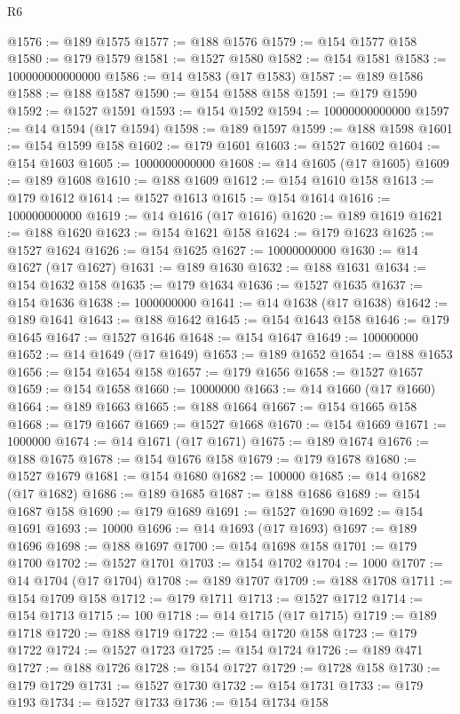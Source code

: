 \begin{lexlean}{R6}
\begin{coremodule}
{{{{{{{{{{{{{{{{{{{{{{{{{{{{{{{{{{{{{{{{{{{{{{{{{{{{{{{{{{{{{{{{{{{{{{{{@1576 := @189 @1575
@1577 := @188 @1576
@1579 := @154 @1577 @158
@1580 := @179 @1579
@1581 := @1527 @1580
@1582 := @154 @1581
@1583 := 100000000000000
@1586 := @14 @1583 (@17 @1583)
@1587 := @189 @1586
@1588 := @188 @1587
@1590 := @154 @1588 @158
@1591 := @179 @1590
@1592 := @1527 @1591
@1593 := @154 @1592
@1594 := 10000000000000
@1597 := @14 @1594 (@17 @1594)
@1598 := @189 @1597
@1599 := @188 @1598
@1601 := @154 @1599 @158
@1602 := @179 @1601
@1603 := @1527 @1602
@1604 := @154 @1603
@1605 := 1000000000000
@1608 := @14 @1605 (@17 @1605)
@1609 := @189 @1608
@1610 := @188 @1609
@1612 := @154 @1610 @158
@1613 := @179 @1612
@1614 := @1527 @1613
@1615 := @154 @1614
@1616 := 100000000000
@1619 := @14 @1616 (@17 @1616)
@1620 := @189 @1619
@1621 := @188 @1620
@1623 := @154 @1621 @158
@1624 := @179 @1623
@1625 := @1527 @1624
@1626 := @154 @1625
@1627 := 10000000000
@1630 := @14 @1627 (@17 @1627)
@1631 := @189 @1630
@1632 := @188 @1631
@1634 := @154 @1632 @158
@1635 := @179 @1634
@1636 := @1527 @1635
@1637 := @154 @1636
@1638 := 1000000000
@1641 := @14 @1638 (@17 @1638)
@1642 := @189 @1641
@1643 := @188 @1642
@1645 := @154 @1643 @158
@1646 := @179 @1645
@1647 := @1527 @1646
@1648 := @154 @1647
@1649 := 100000000
@1652 := @14 @1649 (@17 @1649)
@1653 := @189 @1652
@1654 := @188 @1653
@1656 := @154 @1654 @158
@1657 := @179 @1656
@1658 := @1527 @1657
@1659 := @154 @1658
@1660 := 10000000
@1663 := @14 @1660 (@17 @1660)
@1664 := @189 @1663
@1665 := @188 @1664
@1667 := @154 @1665 @158
@1668 := @179 @1667
@1669 := @1527 @1668
@1670 := @154 @1669
@1671 := 1000000
@1674 := @14 @1671 (@17 @1671)
@1675 := @189 @1674
@1676 := @188 @1675
@1678 := @154 @1676 @158
@1679 := @179 @1678
@1680 := @1527 @1679
@1681 := @154 @1680
@1682 := 100000
@1685 := @14 @1682 (@17 @1682)
@1686 := @189 @1685
@1687 := @188 @1686
@1689 := @154 @1687 @158
@1690 := @179 @1689
@1691 := @1527 @1690
@1692 := @154 @1691
@1693 := 10000
@1696 := @14 @1693 (@17 @1693)
@1697 := @189 @1696
@1698 := @188 @1697
@1700 := @154 @1698 @158
@1701 := @179 @1700
@1702 := @1527 @1701
@1703 := @154 @1702
@1704 := 1000
@1707 := @14 @1704 (@17 @1704)
@1708 := @189 @1707
@1709 := @188 @1708
@1711 := @154 @1709 @158
@1712 := @179 @1711
@1713 := @1527 @1712
@1714 := @154 @1713
@1715 := 100
@1718 := @14 @1715 (@17 @1715)
@1719 := @189 @1718
@1720 := @188 @1719
@1722 := @154 @1720 @158
@1723 := @179 @1722
@1724 := @1527 @1723
@1725 := @154 @1724
@1726 := @189 @471
@1727 := @188 @1726
@1728 := @154 @1727
@1729 := @1728 @158
@1730 := @179 @1729
@1731 := @1527 @1730
@1732 := @154 @1731
@1733 := @179 @193
@1734 := @1527 @1733
@1736 := @154 @1734 @158
}}}}}}}}}}}}}}}}}}}}}}}}}}}}}}}}}}}}}}}}}}}}}}}}}}}}}}}}}}}}}}}}}}}}}}}}
\end{coremodule}
\end{lexlean}
